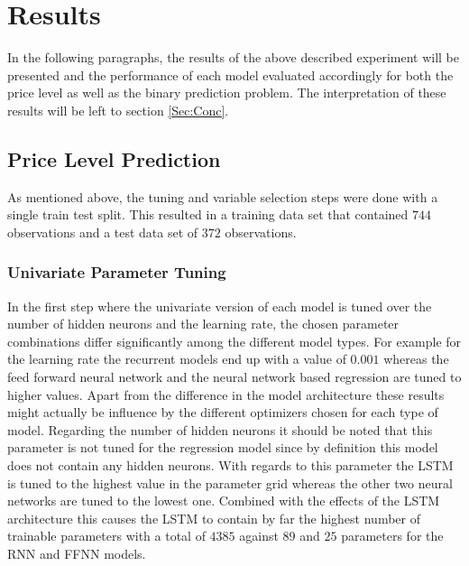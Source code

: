 \chapter{Results}
In the following paragraphs, the results of the above described experiment will be presented and the performance of each model evaluated accordingly for both the price level as well as the binary prediction problem. The interpretation of these results will be left to section \ref{Sec:Conc}.
\section{Price Level Prediction}
As mentioned above, the tuning and variable selection steps were done with a single train test split. This resulted in a training data set that contained $744$ observations and a test data set of $372$ observations.
\subsection{Univariate Parameter Tuning}
In the first step where the univariate version of each model is tuned over the number of hidden neurons and the learning rate, the chosen parameter combinations differ significantly among the different model types. For example for the learning rate the recurrent models end up with a value of $0.001$ whereas the feed forward neural network and the neural network based regression are tuned to higher values. Apart from the difference in the model architecture these results might actually be influence by the different optimizers chosen for each type of model. Regarding the number of hidden neurons it should be noted that this parameter is not tuned for the regression model since by definition this model does not contain any hidden neurons. With regards to this parameter the LSTM is tuned to the highest value in the parameter grid whereas the other two neural networks are tuned to the lowest one. Combined with the effects of the LSTM architecture this causes the LSTM to contain by far the highest number of trainable parameters with a total of $4385$ against $89$ and $25$ parameters for the RNN and FFNN models.


